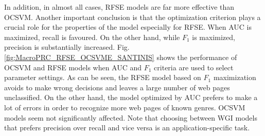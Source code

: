 \documentclass[runningheads]{llncs}
\begin{document}
In addition, in almost all cases, RFSE models are far more effective than OCSVM. Another important conclusion is that the optimization criterion plays a crucial role for the properties of the model especially for RFSE. When AUC is maximized, recall is favoured. On the other hand, while $F_{1}$ is maximized, precision is substantially increased. Fig.  \ref{fig:MacroPRC_RFSE_OCSVME_SANTINIS} shows the performance of OCSVM and RFSE models when AUC and $F_{1}$ criteria are used to select parameter settings. As can be seen, the RFSE model based on $F_{1}$ maximization avoids to make wrong decisions and leaves a large number of web pages unclassified. On the other hand, the model optimized by AUC prefers to make a lot of errors in order to recognize more web pages of known genres. OCSVM models seem not significantly affected. Note that choosing between WGI models that prefers precision over recall and vice versa is an application-specific task.
\end{document}
